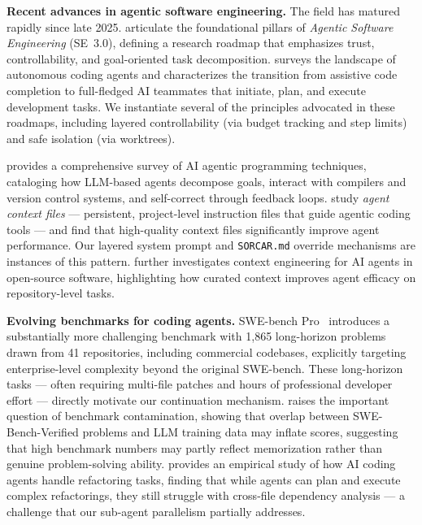 \documentclass{article}
\begin{document}
\textbf{Recent advances in agentic software engineering.} The field has matured rapidly since late 2025. \citet{hassan2025agentic} articulate the foundational pillars of \emph{Agentic Software Engineering} (SE~3.0), defining a research roadmap that emphasizes trust, controllability, and goal-oriented task decomposition.  \citet{li2025rise} surveys the landscape of autonomous coding agents and characterizes the transition from assistive code completion to full-fledged AI teammates that initiate, plan, and execute development tasks.  We instantiate several of the principles advocated in these roadmaps, including layered controllability (via budget tracking and step limits) and safe isolation (via worktrees).

\citet{wang2025agentic} provides a comprehensive survey of AI agentic programming techniques, cataloging how LLM-based agents decompose goals, interact with compilers and version control systems, and self-correct through feedback loops. \citet{chatlatanagulchai2025readmes} study \emph{agent context files} --- persistent, project-level instruction files that guide agentic coding tools --- and find that high-quality context files significantly improve agent performance.  Our layered system prompt and \texttt{SORCAR.md} override mechanisms are instances of this pattern. \citet{mohsenimofidi2025context} further investigates context engineering for AI agents in open-source software, highlighting how curated context improves agent efficacy on repository-level tasks.

\textbf{Evolving benchmarks for coding agents.} SWE-bench Pro~\citep{deng2025swebenchpro} introduces a substantially more challenging benchmark with 1,865 long-horizon problems drawn from 41 repositories, including commercial codebases, explicitly targeting enterprise-level complexity beyond the original SWE-bench.  These long-horizon tasks --- often requiring multi-file patches and hours of professional developer effort --- directly motivate our continuation mechanism.  \citet{prathifkumar2025swebenchverified} raises the important question of benchmark contamination, showing that overlap between SWE-Bench-Verified problems and LLM training data may inflate scores, suggesting that high benchmark numbers may partly reflect memorization rather than genuine problem-solving ability. \citet{horikawa2025agentic} provides an empirical study of how AI coding agents handle refactoring tasks, finding that while agents can plan and execute complex refactorings, they still struggle with cross-file dependency analysis --- a challenge that our sub-agent parallelism partially addresses.
\end{document}
